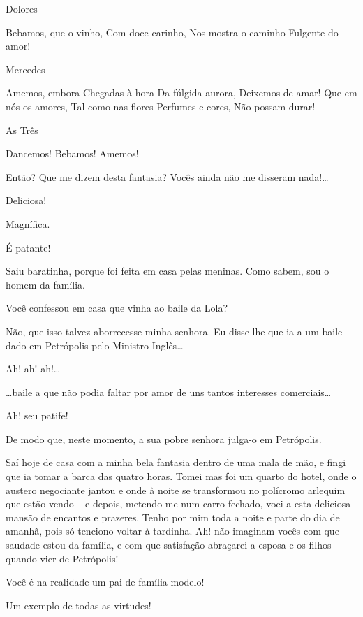  Dolores

 Bebamos, que o vinho,
 Com doce carinho,
 Nos mostra o caminho
 Fulgente do amor!

 Mercedes

 Amemos, embora
 Chegadas à hora
 Da fúlgida aurora,
 Deixemos de amar!
 Que em nós os amores,
 Tal como nas flores
 Perfumes e cores,
 Não possam durar!

 As Três

 Dancemos! Bebamos! Amemos!

  Então? Que me dizem desta
fantasia? Vocês ainda não me disseram nada!\ldots{}

 Deliciosa!

 Magnífica.

 É patante!

 Saiu baratinha, porque foi feita em casa pelas meninas. Como
sabem, sou o homem da família.

 Você confessou em casa que vinha ao baile da Lola?

 Não, que isso talvez aborrecesse minha senhora. Eu disse-lhe
que ia a um baile dado em Petrópolis pelo Ministro Inglês\ldots{}

 Ah! ah! ah!\ldots{}

  \ldots{}baile a que não podia faltar por amor de uns
tantos interesses comerciais\ldots{}

 Ah! seu patife!

 De modo que, neste momento, a sua pobre senhora julga-o em
Petrópolis.

  Saí hoje de casa com a
minha bela fantasia dentro de uma mala de mão, e fingi que ia tomar a barca das
quatro horas. Tomei mas foi um quarto do hotel, onde o austero negociante jantou e
onde à noite se transformou no polícromo arlequim que estão vendo -- e depois,
metendo-me num carro fechado, voei a esta deliciosa mansão de encantos e prazeres.
Tenho por mim toda a noite e parte do dia de amanhã, pois só tenciono voltar à
tardinha. Ah! não imaginam vocês com que saudade estou da família, e com que
satisfação abraçarei a esposa e os filhos quando vier de Petrópolis!

 Você é na realidade um pai de família modelo!

 Um exemplo de todas as virtudes!


